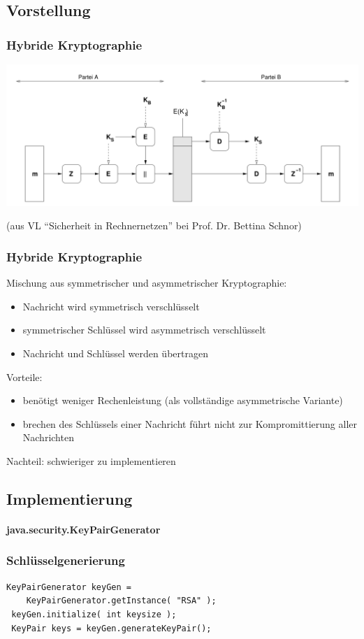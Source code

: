 \documentclass{beamer}
\begin{document}
\subsection*{Vorstellung}
\begin{frame}
\frametitle{Hybride Kryptographie}
\hspace*{-1cm}
\includegraphics[width=\paperwidth]{hybrid.PNG} 

\hspace*{-0.5cm}
(aus VL "`Sicherheit in Rechnernetzen"' bei Prof. Dr. Bettina Schnor)
\end{frame}

\begin{frame}
\frametitle{Hybride Kryptographie}

Mischung aus symmetrischer und asymmetrischer Kryptographie:
\begin{itemize}
	\item Nachricht wird symmetrisch verschlüsselt
	\item symmetrischer Schlüssel wird asymmetrisch verschlüsselt
	\item Nachricht und Schlüssel werden übertragen
\end{itemize}
Vorteile:
\begin{itemize}
	\item benötigt weniger Rechenleistung (als vollständige asymmetrische Variante)
	\item brechen des Schlüssels einer Nachricht führt nicht zur Kompromittierung aller Nachrichten
\end{itemize}
Nachteil: schwieriger zu implementieren
\end{frame}
\subsection*{Implementierung}
\begin{frame}[fragile]
\framesubtitle{java.security.KeyPairGenerator}
\frametitle{Schlüsselgenerierung}

\begin{lstlisting}[frame=shadowbox]
 KeyPairGenerator keyGen = 
 	KeyPairGenerator.getInstance( "RSA" );
 keyGen.initialize( int keysize );
 KeyPair keys = keyGen.generateKeyPair();
\end{lstlisting}
\end{frame}
\end{document}
